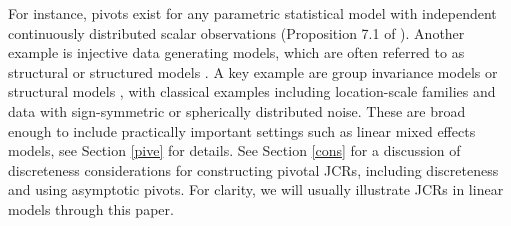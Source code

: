 \documentclass[english]{article}
\begin{document}
For instance, pivots exist for any parametric statistical model with independent continuously distributed scalar observations (Proposition 7.1 of \cite{shao2003mathematical}).
Another example is injective data generating models, which are often referred to as structural or structured models \citep{fraser1966structural,fraser1968structure,fraser1971events,brenner1983models,fraser1996some}. 
A key example are group invariance models or structural models \citep{fraser1968structure}, 
with classical examples including location-scale families and data with sign-symmetric or spherically distributed noise. 
These are broad enough to include practically important settings such as 
linear mixed effects models, see Section \ref{pive} for details.
See Section \ref{cons} for a discussion of discreteness considerations for constructing pivotal JCRs, including discreteness and using asymptotic pivots.
For clarity, we will usually illustrate JCRs in linear models through this paper.
\end{document}
